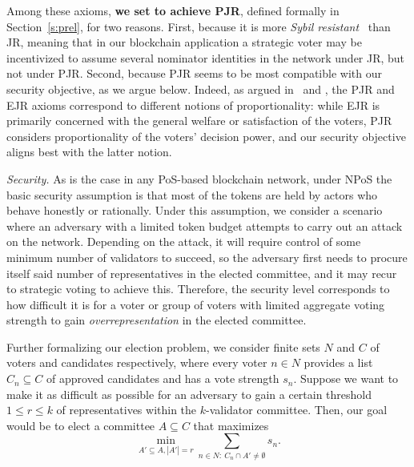 Among these axioms, \textbf{we set to achieve PJR}, defined formally in Section~\ref{s:prel}, for two reasons. 
First, because it is more \emph{Sybil resistant}~\cite{douceur2002sybil} than JR, meaning that in our blockchain application a strategic voter may be incentivized to assume several nominator identities in the network under JR, but not under PJR. 
Second, because PJR seems to be most compatible with our security objective, as we argue below. Indeed, as argued in~\cite{peters2019proportionality} and \cite{lackner2020approval}, the PJR and EJR axioms correspond to different notions of proportionality: while EJR is primarily concerned with the general welfare or satisfaction of the voters, PJR considers proportionality of the voters' decision power, and our security objective aligns best with the latter notion.

\emph{Security.} 
As is the case in any PoS-based blockchain network, under NPoS the basic security assumption is that most of the tokens are held by actors who behave honestly or rationally. Under this assumption, we consider a scenario where an adversary with a limited token budget attempts to carry out an attack on the network. Depending on the attack, it will require control of some minimum number of validators to succeed, so the adversary first needs to procure itself said number of representatives in the elected committee, and it may recur to strategic voting to achieve this. Therefore, the security level corresponds to how difficult it is for a voter or group of voters with limited aggregate voting strength to gain \emph{overrepresentation} in the elected committee. 

Further formalizing our election problem, we consider finite sets $N$ and $C$ of voters and candidates respectively, where every voter $n\in N$ provides a list $C_n\subseteq C$ of approved candidates and has a vote strength $s_n$. 
Suppose we want to make it as difficult as possible for an adversary to gain a certain threshold $1\leq r\leq k$ of representatives within the $k$-validator committee. 
Then, our goal would be to elect a committee $A\subseteq C$ that maximizes 
$$\min_{A'\subseteq A, |A'|=r} \sum_{n\in N: \ C_n\cap A'\neq \emptyset} s_n.$$ 

